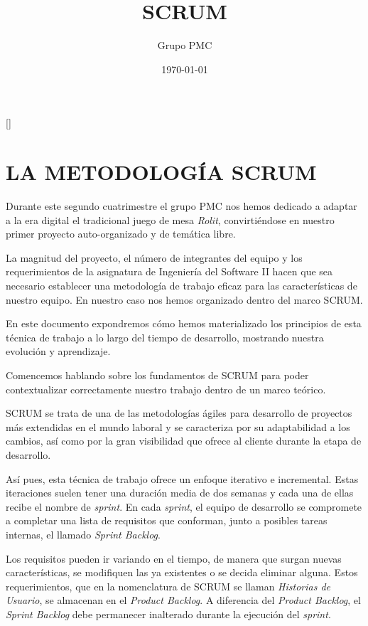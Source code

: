 \documentclass[12pt,a4paper,openright]{book}
\title{\Huge SCRUM}
\date{\today}
\author{Grupo PMC}
\newcommand{\defaultformat}{
	\titleformat{\chapter}[display]{\centering\normalfont\huge\bfseries}{}{0pt}{\Huge ##1}[\titlerule]
    \titleformat{\section}{\normalfont\Large\bfseries}{}{0pt}{##1}
    \titleformat{\subsection}{\normalfont\large\bfseries}{}{0pt}{\uline{##1}}
    \titleformat{\subsubsection}{\normalfont\normalsize\bfseries}{}{0pt}{##1}
}
\begin{document}
\defaultformat
\maketitle
\setcounter{tocdepth}{3}
\setcounter{secnumdepth}{3}
\tableofcontents

\chapter{LA METODOLOGÍA SCRUM}\label{scrum_mth}
Durante este segundo cuatrimestre el grupo PMC nos hemos dedicado a adaptar a la era digital el tradicional juego de mesa \textit{Rolit}, convirtiéndose en nuestro primer proyecto auto-organizado y de temática libre.

La magnitud del proyecto, el número de integrantes del equipo y los requerimientos de la asignatura de Ingeniería del Software II hacen que sea necesario establecer una metodología de trabajo eficaz para las características de nuestro equipo. En nuestro caso nos hemos organizado dentro del marco SCRUM.

En este documento expondremos cómo hemos materializado los principios de esta técnica de trabajo a lo largo del tiempo de desarrollo, mostrando nuestra evolución y aprendizaje.

Comencemos hablando sobre los fundamentos de SCRUM para poder contextualizar correctamente nuestro trabajo dentro de un marco teórico.

SCRUM se trata de una de las metodologías ágiles para desarrollo de proyectos más extendidas en el mundo laboral y se caracteriza por su adaptabilidad a los cambios, así como por la gran visibilidad que ofrece al cliente durante la etapa de desarrollo.

Así pues, esta técnica de trabajo ofrece un enfoque iterativo e incremental. Estas iteraciones suelen tener una duración media de dos semanas y cada una de ellas recibe el nombre de \textit{sprint}. En cada \textit{sprint}, el equipo de desarrollo se compromete a completar una lista de requisitos que conforman, junto a posibles tareas internas, el llamado \textit{Sprint Backlog}.

Los requisitos pueden ir variando en el tiempo, de manera que surgan nuevas características, se modifiquen las ya existentes o se decida eliminar alguna. Estos requerimientos, que en la nomenclatura de SCRUM se llaman \textit{Historias de Usuario}, se almacenan en el \textit{Product Backlog}. A diferencia del \textit{Product Backlog}, el \textit{Sprint Backlog} debe permanecer inalterado durante la ejecución del \textit{sprint}.
\end{document}
